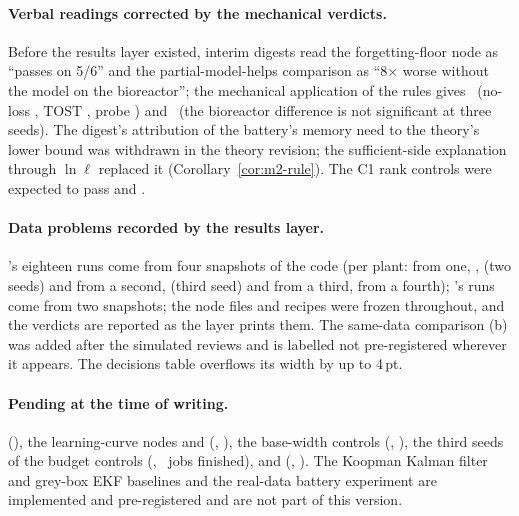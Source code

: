 \paragraph{Verbal readings corrected by the mechanical verdicts.} Before the results layer existed, interim digests read the forgetting-floor node as ``passes on 5/6'' and the partial-model-helps comparison as ``8$\times$ worse without the model on the bioreactor''; the mechanical application of the rules gives \OutcomeCTwoFloorFive\ (no-loss \CtwoFloorFiveNoLoss, TOST \CtwoFloorFiveTostNonInferior, probe \CtwoFloorFiveProbeAboveFloor) and \OutcomeCThreePartialModelfree\ (the bioreactor difference is not significant at three seeds). The digest's attribution of the battery's memory need to the theory's lower bound was withdrawn in the theory revision; the sufficient-side explanation through $\ln\ell$ replaced it (Corollary~\ref{cor:m2-rule}). The C1 rank controls were expected to pass and \FAIL.

\paragraph{Data problems recorded by the results layer.} 's eighteen runs come from four snapshots of the code (per plant:  from one, ,  (two seeds) and  from a second,  (third seed) and  from a third,  from a fourth); 's runs come from two snapshots; the node files and recipes were frozen throughout, and the verdicts are reported as the layer prints them. The same-data comparison (b) was added after the simulated reviews and is labelled not pre-registered wherever it appears. The decisions table overflows its width by up to 4\,pt.

\paragraph{Pending at the time of writing.}  (\OutcomeCOneModelfree), the learning-curve nodes  and  (\OutcomeCThreeDataFifty, \OutcomeCThreeDataOneFiveZero), the base-width controls (\OutcomeCOneBasewidthSixtyFour, \OutcomeCOneBasewidthTwoFiveSix), the third seeds of the budget controls (\JobsCOneBudgetS, \JobsCOneBudgetL\ jobs finished), and  (\OutcomeTESTCThree, \JobsTESTCThree). The Koopman Kalman filter and grey-box EKF baselines and the real-data battery experiment are implemented and pre-registered and are not part of this version.

